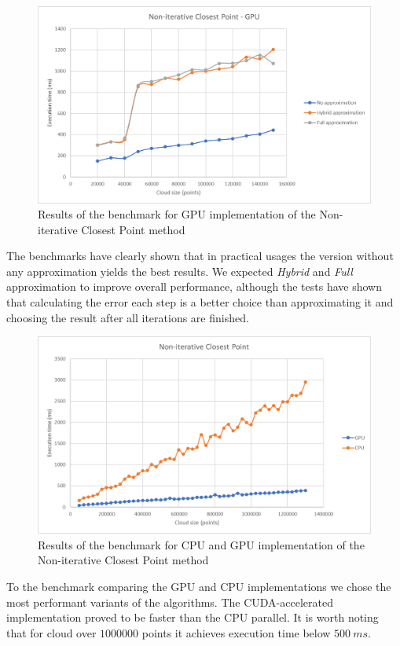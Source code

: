 \documentclass[titlepage]{article}
\begin{document}
\begin{figure}[H]
\includegraphics[width=\textwidth]{ms-nicp-3.png}
\caption{Results of the benchmark for GPU implementation of the Non-iterative Closest Point method}
\end{figure}

The benchmarks have clearly shown that in practical usages the version without any approximation yields the best results. We expected \textit{Hybrid} and \textit{Full} approximation to improve overall performance, although the tests have shown that calculating the error each step is a better choice than approximating it and choosing the result after all iterations are finished.

\begin{figure}[H]
\includegraphics[width=\textwidth]{ms-nicp-4.png}
\caption{Results of the benchmark for CPU and GPU implementation of the Non-iterative Closest Point method}
\end{figure}

To the benchmark comparing the GPU and CPU implementations we chose the most performant variants of the algorithms. The CUDA-accelerated implementation proved to be faster than the CPU parallel. It is worth noting that for cloud over $1000000$ points it achieves execution time below $500\: ms$. 
\end{document}
